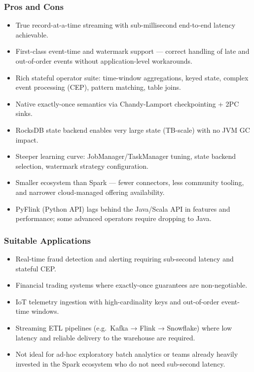 \subsubsection{Pros and Cons}

\begin{itemize}
  \item[\textbf{+}] True record-at-a-time streaming with sub-millisecond end-to-end latency achievable.
  \item[\textbf{+}] First-class event-time and watermark support — correct handling of late and out-of-order events without application-level workarounds.
  \item[\textbf{+}] Rich stateful operator suite: time-window aggregations, keyed state, complex event processing (CEP), pattern matching, table joins.
  \item[\textbf{+}] Native exactly-once semantics via Chandy-Lamport checkpointing + 2PC sinks.
  \item[\textbf{+}] RocksDB state backend enables very large state (TB-scale) with no JVM GC impact.
  \item[\textbf{--}] Steeper learning curve: JobManager/TaskManager tuning, state backend selection, watermark strategy configuration.
  \item[\textbf{--}] Smaller ecosystem than Spark — fewer connectors, less community tooling, and narrower cloud-managed offering availability.
  \item[\textbf{--}] PyFlink (Python API) lags behind the Java/Scala API in features and performance; some advanced operators require dropping to Java.
\end{itemize}

\subsubsection{Suitable Applications}

\begin{itemize}
  \item Real-time fraud detection and alerting requiring sub-second latency and stateful CEP.
  \item Financial trading systems where exactly-once guarantees are non-negotiable.
  \item IoT telemetry ingestion with high-cardinality keys and out-of-order event-time windows.
  \item Streaming ETL pipelines (e.g.\ Kafka → Flink → Snowflake) where low latency and reliable delivery to the warehouse are required.
  \item Not ideal for ad-hoc exploratory batch analytics or teams already heavily invested in the Spark ecosystem who do not need sub-second latency.
\end{itemize}
